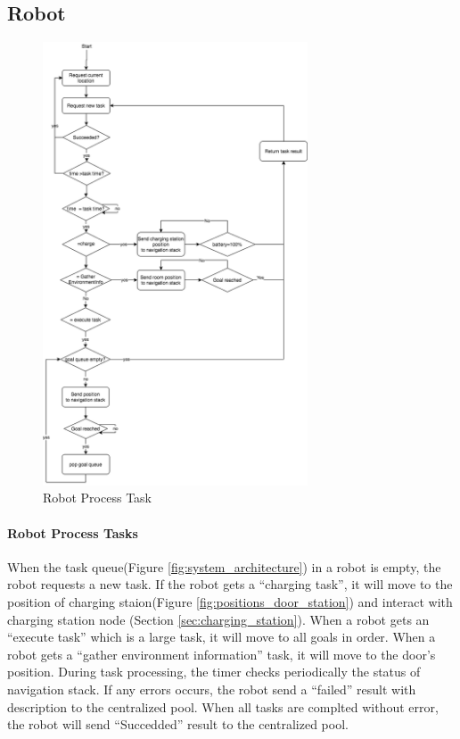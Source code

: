 \subsection{Robot}

\begin{figure}[htbp]
    \centering
    \includegraphics[width = 0.7\textwidth]{content/images/ch4/robot_process_task.drawio.png}
    \caption{Robot Process Task }
    \label{fig:task_process_robot}
\end{figure}

\paragraph{Robot Process Tasks}
When the task queue(Figure \ref{fig:system_architecture}) in a robot is empty, the robot requests a new task. If the robot gets a ``charging task'', it will move to the position of charging staion(Figure \ref{fig:positions_door_station}) and interact with charging station node (Section \ref{sec:charging_station}).
When a robot gets an ``execute task'' which is a large task, it will move to all goals in order.
When a robot gets a ``gather environment information'' task, it will move to the door's position.
During task processing, the timer checks periodically the status of navigation stack. If any errors occurs, the robot send a ``failed'' result with description to the centralized pool.  
When all tasks are complted without error, the robot will send ``Succedded'' result to the centralized pool.



